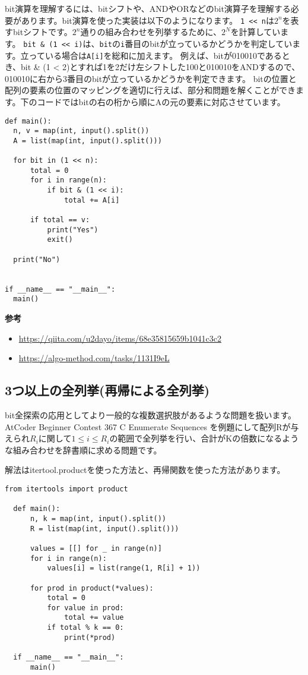 \documentclass{jlreq}
\begin{document}
bit演算を理解するには、bitシフトや、ANDやORなどのbit演算子を理解する必要があります。bit演算を使った実装は以下のようになります。
\texttt{1 << n}は$2^n$を表すbitシフトです。$2^n$通りの組み合わせを列挙するために、$2^N$を計算しています。
\texttt{bit \& (1 << i)}は、\texttt{bit}の\texttt{i}番目のbitが立っているかどうかを判定しています。立っている場合は\texttt{A[i]}を総和に加えます。
例えば、bitが010010であるとき、bit \& (1 < 2)とすれば1を2だけ左シフトした100と010010をANDするので、010010に右から3番目のbitが立っているかどうかを判定できます。
bitの位置と配列の要素の位置のマッピングを適切に行えば、部分和問題を解くことができます。下のコードではbitの右の桁から順にAの元の要素に対応させています。

\begin{lstlisting}[caption=bit演算を使ったbit全探索, label=bit_search, frame=TRBL]
def main():
  n, v = map(int, input().split())
  A = list(map(int, input().split()))
  
  for bit in (1 << n):
      total = 0
      for i in range(n):
          if bit & (1 << i):
              total += A[i]
      
      if total == v:
          print("Yes")
          exit()
  
  print("No")
              

if __name__ == "__main__":
  main()
\end{lstlisting}

\textbf{参考}
\begin{itemize}
	\item \url{https://qiita.com/u2dayo/items/68e35815659b1041c3c2}
	\item \url{https://algo-method.com/tasks/1131I9eL}
\end{itemize}

\subsection{3つ以上の全列挙(再帰による全列挙)}
bit全探索の応用としてより一般的な複数選択肢があるような問題を扱います。AtCoder Beginner Contest 367 C Enumerate Sequences
を例題にして配列Rが与えられ$R_i$に関して$1 \leq i \leq R_i$の範囲で全列挙を行い、合計がKの倍数になるような組み合わせを辞書順に求める問題です。

解法はitertool.productを使った方法と、再帰関数を使った方法があります。

\begin{lstlisting}[caption=itertools.productを使った解法, label=product_ans, frame=TRBL]
from itertools import product

  def main():
      n, k = map(int, input().split())
      R = list(map(int, input().split()))
      
      values = [[] for _ in range(n)]
      for i in range(n):
          values[i] = list(range(1, R[i] + 1))
      
      for prod in product(*values):
          total = 0
          for value in prod:
              total += value
          if total % k == 0:
              print(*prod)
  
  if __name__ == "__main__":
      main()
\end{lstlisting}
\end{document}
